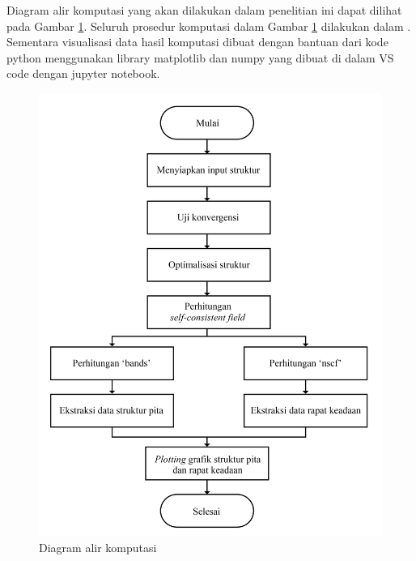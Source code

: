 Diagram alir komputasi yang akan dilakukan dalam penelitian ini dapat dilihat pada Gambar \ref{FlowchartKomputasi}. Seluruh prosedur komputasi dalam Gambar \ref{FlowchartKomputasi} dilakukan dalam \qe. Sementara visualisasi data hasil komputasi dibuat dengan bantuan dari kode python menggunakan library matplotlib dan numpy yang dibuat di dalam VS code dengan jupyter notebook.
\begin{figure}
    \centering
    \includegraphics[width=12cm]{gambar/Flowchart Komputasi.png}
    \caption{Diagram alir komputasi}
    \label{FlowchartKomputasi}
\end{figure}


